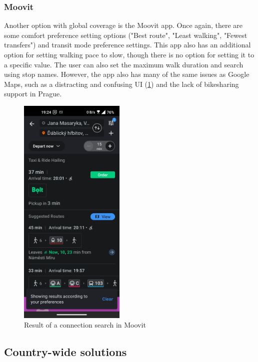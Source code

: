 \subsubsection{Moovit}
Another option with global coverage is the Moovit app. Once again, there are some comfort preference setting options ("Best route", "Least walking", "Fewest transfers") and transit mode preference settings. This app also has an additional option for setting walking pace to slow, though there is no option for setting it to a specific value. The user can also set the maximum walk duration and search using stop names. However, the app also has many of the same issues as Google Maps, such as a distracting and confusing UI (\cref{fig:moovit}) and the lack of bikesharing support in Prague.



\begin{figure}[h!]
    \centering
    \includegraphics[width=0.45\textwidth]{img/screenshots/moovit_result.jpg}
    \caption{Result of a connection search in Moovit}
    \label{fig:moovit}
\end{figure}

\subsection{Country-wide solutions}

